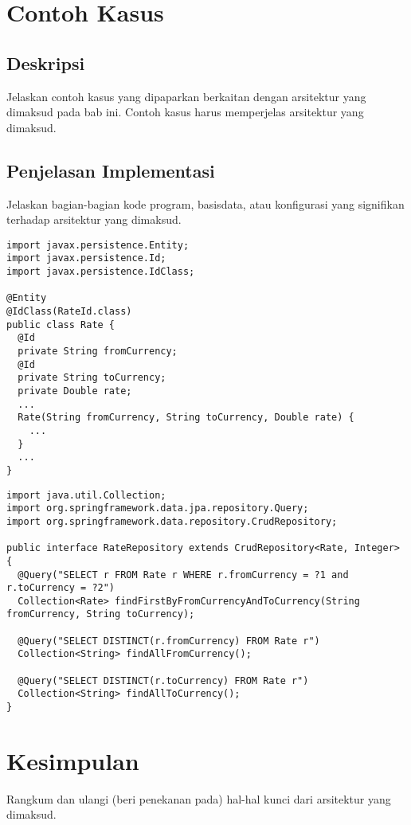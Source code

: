 \section{Contoh Kasus}

\subsection{Deskripsi}
Jelaskan contoh kasus yang dipaparkan berkaitan dengan arsitektur yang dimaksud pada bab ini.
Contoh kasus harus memperjelas arsitektur yang dimaksud.

\subsection{Penjelasan Implementasi}
Jelaskan bagian-bagian kode program, basisdata, atau konfigurasi yang signifikan terhadap arsitektur yang dimaksud.

\begin{lstlisting}[firstnumber=1,style=java,caption={Model dari \textsf{Rate}.},label=lst:rate_model]
import javax.persistence.Entity;
import javax.persistence.Id;
import javax.persistence.IdClass;

@Entity
@IdClass(RateId.class)
public class Rate {
  @Id
  private String fromCurrency;
  @Id
  private String toCurrency;
  private Double rate;
  ...
  Rate(String fromCurrency, String toCurrency, Double rate) {
    ...
  }
  ...
}
\end{lstlisting}

\begin{lstlisting}[firstnumber=1,style=java,caption={ \textsf{RateRepository}.},label=lst:rate_repository]
import java.util.Collection;
import org.springframework.data.jpa.repository.Query;
import org.springframework.data.repository.CrudRepository;

public interface RateRepository extends CrudRepository<Rate, Integer> {  
  @Query("SELECT r FROM Rate r WHERE r.fromCurrency = ?1 and r.toCurrency = ?2")
  Collection<Rate> findFirstByFromCurrencyAndToCurrency(String fromCurrency, String toCurrency);
  
  @Query("SELECT DISTINCT(r.fromCurrency) FROM Rate r")
  Collection<String> findAllFromCurrency();
  
  @Query("SELECT DISTINCT(r.toCurrency) FROM Rate r")
  Collection<String> findAllToCurrency(); 
}
\end{lstlisting}


\section{Kesimpulan}
Rangkum dan ulangi (beri penekanan pada) hal-hal kunci dari arsitektur yang dimaksud.
